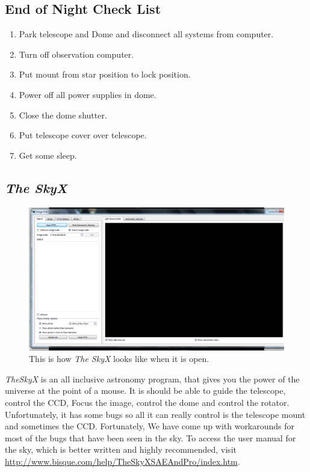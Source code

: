 \documentclass[12pt,twoside,a4paper]{report}
\begin{document}

\subsection{End of Night Check List}
\begin{enumerate}
 \item Park telescope and Dome and disconnect all systems from computer.
 \item Turn off observation computer.
 \item Put mount from star position to lock position.
 \item Power off all power supplies in dome.
 \item Close the dome shutter.
 \item Put telescope cover over telescope.
 \item Get some sleep.
\end{enumerate}

\subsection{\emph{The SkyX}}

\begin{figure}[h]
 \centering
    \includegraphics[width=\textwidth]{documentation_images/basic_interface.png}
    \caption{\label{fig:basic_interface} This is how \emph{The SkyX} looks like when it is open.}
\end{figure}

\emph{TheSkyX} is an all inclusive astronomy program, that gives you the power of the universe at the point of a mouse. It is should be able to guide the telescope, control the CCD, Focus the image, control the dome and control the rotator. Unfortunately, it has some bugs so all it can really control is the telescope mount and sometimes the CCD. Fortunately, We have come up with workarounds for most of the bugs that have been seen in the sky. To access the user manual for the sky, which is better written and highly recommended, visit \url{http://www.bisque.com/help/TheSkyXSAEAndPro/index.htm}.
\end{document}
